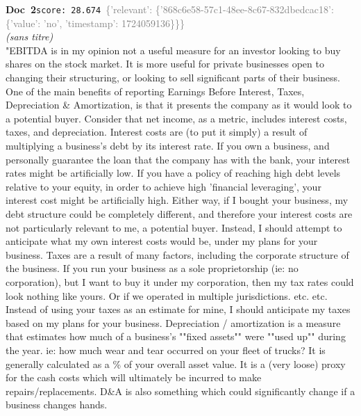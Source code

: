 \documentclass[a4paper,11pt]{article}
\begin{document}
\begin{docenv}
{\footnotesize\textcolor{doccolor}{\textbf{Doc~2}}}\hfill{\tiny\texttt{score:~28.674}}\ {\tiny\textcolor{gray}{\{'relevant': \{'868c6e58-57c1-48ee-8c67-832dbedcac18': \{'value': 'no', 'timestamp': 1724059136\}\}\}}}\\[3pt]
{\small\textit{(sans titre)}}\\[2pt]
\vspace{2pt}
{\footnotesize 
"EBITDA is in my opinion not a useful measure for an investor looking to buy shares on the stock market. It is more useful for private businesses open to changing their structuring, or looking to sell significant parts of their business. One of the main benefits of reporting Earnings Before Interest, Taxes, Depreciation \& Amortization, is that it presents the company as it would look to a potential buyer. Consider that net income, as a metric, includes interest costs, taxes, and depreciation. Interest costs are (to put it simply) a result of multiplying a business's debt by its interest rate. If you own a business, and personally guarantee the loan that the company has with the bank, your interest rates might be artificially low. If you have a policy of reaching high debt levels relative to your equity, in order to achieve high 'financial leveraging', your interest cost might be artificially high. Either way, if I bought your business, my debt structure could be completely different, and therefore your interest costs are not particularly relevant to me, a potential buyer. Instead, I should attempt to anticipate what my own interest costs would be, under my plans for your business. Taxes are a result of many factors, including the corporate structure of the business. If you run your business as a sole proprietorship (ie: no corporation), but I want to buy it under my corporation, then my tax rates could look nothing like yours. Or if we operated in multiple jurisdictions. etc. etc. Instead of using your taxes as an estimate for mine, I should anticipate my taxes based on my plans for your business. Depreciation / amortization is a measure that estimates how much of a business's ""fixed assets"" were ""used up"" during the year. ie: how much wear and tear occurred on your fleet of trucks? It is generally calculated as a \% of your overall asset value. It is a (very loose) proxy for the cash costs which will ultimately be incurred to make repairs/replacements. D\&A is also something which could significantly change if a business changes hands.}
\end{docenv}
\end{document}
